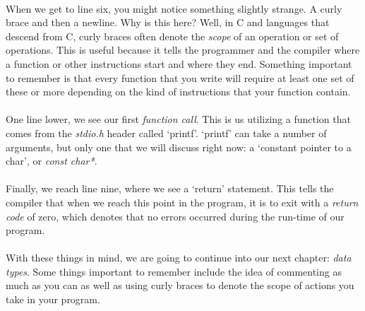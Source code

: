 \paragraph{}
   When we get to line six, you might notice something slightly strange. A curly brace and then a newline. Why is this here? Well, in C and languages
   that descend from C, curly braces often denote the \textit{scope} of an operation or set of operations. This is useful because it tells the
   programmer and the compiler where a function or other instructions start and where they end. Something important to remember is that every function
   that you write will require at least one set of these or more depending on the kind of instructions that your function contain.

\paragraph{}
   One line lower, we see our first \textit{function call}. This is us utilizing a function that comes from the \textit{stdio.h} header called `printf'.
   `printf' can take a number of arguments, but only one that we will discuss right now: a `constant pointer to a char', or \textit{const char*}.

\paragraph{}
   Finally, we reach line nine, where we see a `return' statement. This tells the compiler that when we reach this point in the program, it is to exit
   with a \textit{return code} of zero, which denotes that no errors occurred during the run-time of our program.

\paragraph{}
   With these things in mind, we are going to continue into our next chapter: \textit{data types}. Some things important to remember include the idea
   of commenting as much as you can as well as using curly braces to denote the scope of actions you take in your program.

\newpage
